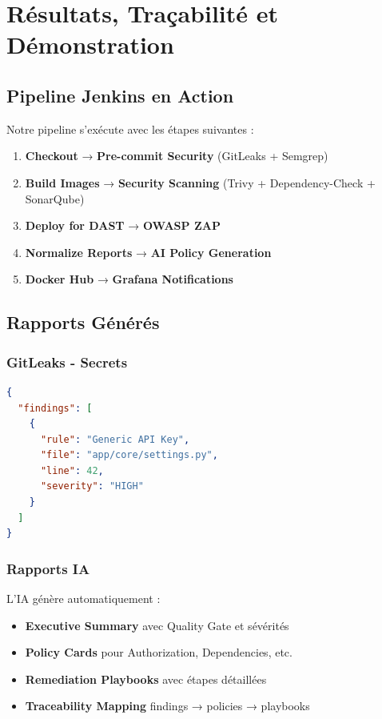 \documentclass[12pt,a4paper]{report}
\begin{document}
\newpage

\chapter{Résultats, Traçabilité et Démonstration}

\section{Pipeline Jenkins en Action}

Notre pipeline s'exécute avec les étapes suivantes :

\begin{enumerate}
    \item \textbf{Checkout} → \textbf{Pre-commit Security} (GitLeaks + Semgrep)
    \item \textbf{Build Images} → \textbf{Security Scanning} (Trivy + Dependency-Check + SonarQube)
    \item \textbf{Deploy for DAST} → \textbf{OWASP ZAP}
    \item \textbf{Normalize Reports} → \textbf{AI Policy Generation}
    \item \textbf{Docker Hub} → \textbf{Grafana Notifications}
\end{enumerate}

\section{Rapports Générés}

\subsection{GitLeaks - Secrets}

\begin{lstlisting}[language=json]
{
  "findings": [
    {
      "rule": "Generic API Key",
      "file": "app/core/settings.py",
      "line": 42,
      "severity": "HIGH"
    }
  ]
}
\end{lstlisting}

\subsection{Rapports IA}

L'IA génère automatiquement :

\begin{itemize}
    \item \textbf{Executive Summary} avec Quality Gate et sévérités
    \item \textbf{Policy Cards} pour Authorization, Dependencies, etc.
    \item \textbf{Remediation Playbooks} avec étapes détaillées
    \item \textbf{Traceability Mapping} findings → policies → playbooks
\end{itemize}
\end{document}
